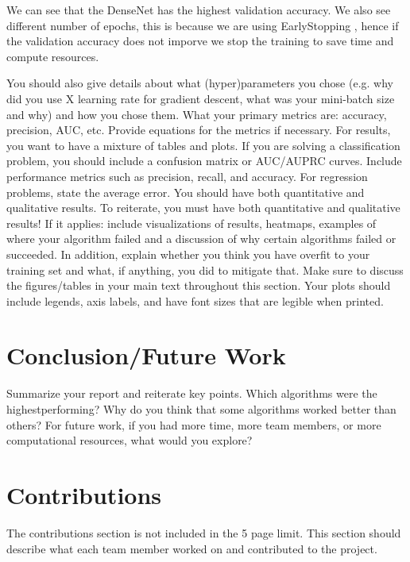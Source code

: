 \documentclass{article}
\begin{document}
We can see that the DenseNet has the highest validation accuracy. We also see different number of epochs, this is because we are using EarlyStopping \cite{geron2019hands}, hence if the validation accuracy does not imporve we stop the training to save time and compute resources. 



You should also give details about what (hyper)parameters you chose (e.g. why did you
use X learning rate for gradient descent, what was your mini-batch size and why) and how
you chose them. What your primary metrics are: accuracy, precision,
AUC, etc. Provide equations for the metrics if necessary. For results, you want to have a
mixture of tables and plots. If you are solving a classification problem, you should include a
confusion matrix or AUC/AUPRC curves. Include performance metrics such as precision,
recall, and accuracy. For regression problems, state the average error. You should have
both quantitative and qualitative results. To reiterate, you must have both quantitative
and qualitative results! If it applies: include visualizations of results, heatmaps,
examples of where your algorithm failed and a discussion of why certain algorithms failed
or succeeded. In addition, explain whether you think you have overfit to your training set
and what, if anything, you did to mitigate that. Make sure to discuss the figures/tables in
your main text throughout this section. Your plots should include legends, axis labels, and
have font sizes that are legible when printed.



\section{Conclusion/Future Work }
Summarize your report and reiterate key points. Which algorithms were the highestperforming?
Why do you think that some algorithms worked better than others? For
future work, if you had more time, more team members, or more computational resources,
what would you explore?



\section{Contributions}
The contributions section is not included in the 5 page limit. This section should describe
what each team member worked on and contributed to the project.
\end{document}
